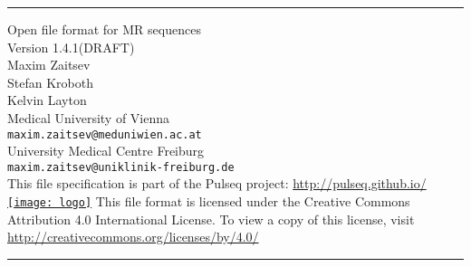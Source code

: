 \documentclass{article}
\date{}
\author{}
\def\myversionmajor{1}
\def\myversionminor{4}
\def\myversionrevision{1}
\def\myversion{\myversionmajor.\myversionminor.\myversionrevision }
\begin{document}
\begin{titlepage}
\begin{centering}
\rule{\textwidth}{5pt}\vskip1cm
\Huge{Open file format for MR sequences \\}
\vspace{1cm}
\LARGE{Version \myversion (DRAFT)\\}
\vspace{1cm}
\large Maxim Zaitsev\\ Stefan Kroboth\\ Kelvin Layton\\ 
\vspace{1cm}
\large Medical University of Vienna \\%
 \verb+maxim.zaitsev@meduniwien.ac.at+\\%
\large University Medical Centre Freiburg \\%
 \verb+maxim.zaitsev@uniklinik-freiburg.de+\\%
 \vspace{1cm}
 This file specification is part of the Pulseq project:
 \vspace{0.5cm}
 \url{http://pulseq.github.io/}\\
 \href{http://pulseq.github.io/}{\texttt{[image: logo]}}
 \vfill
\small This file format is licensed under the Creative Commons Attribution 4.0 International License. To view a copy of this license, visit \url{ http://creativecommons.org/licenses/by/4.0/ }\\
\rule{\textwidth}{5pt}
\end{centering}
\end{titlepage}

\newpage

\setlength\parindent{0pt}
\setlength{\parskip}{0.4\baselineskip}%

\tableofcontents

\setlength\parindent{0pt}
\setlength{\parskip}{\baselineskip}%

\newpage
\end{document}
